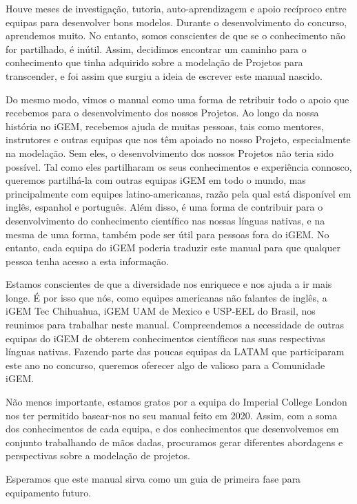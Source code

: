 \documentclass[11pt, letterpaper, portuguese]{article}
\begin{document}
\par{Houve meses de investigação, tutoria, auto-aprendizagem e apoio recíproco entre equipas para desenvolver bons modelos. Durante o desenvolvimento do concurso, aprendemos muito. No entanto, somos conscientes de que se o conhecimento não for partilhado, é inútil. Assim, decidimos encontrar um caminho para o conhecimento que tinha adquirido sobre a modelação de Projetos para transcender, e foi assim que surgiu a ideia de escrever este manual nascido.
} 

\par{Do mesmo modo, vimos o manual como uma forma de retribuir todo o apoio que recebemos para o desenvolvimento dos nossos Projetos. Ao longo da nossa história no iGEM, recebemos ajuda de muitas pessoas, tais como mentores, instrutores e outras equipas que nos têm apoiado no nosso Projeto, especialmente na modelação. Sem eles, o desenvolvimento dos nossos Projetos não teria sido possível. Tal como eles partilharam os seus conhecimentos e experiência connosco, queremos partilhá-la com outras equipas iGEM em todo o mundo, mas principalmente com equipes latino-americanas, razão pela qual está disponível em inglês, espanhol e português. Além disso, é uma forma de contribuir para o desenvolvimento do conhecimento científico nas nossas línguas nativas, e na mesma de uma forma, também pode ser útil para pessoas fora do iGEM. No entanto, cada equipa do iGEM poderia traduzir este manual para que qualquer pessoa tenha acesso a esta informação.} 

\par{Estamos conscientes de que a diversidade nos enriquece e nos ajuda a ir mais longe. É por isso que nós, como equipes americanas não falantes de inglês, a iGEM Tec Chihuahua, iGEM UAM de Mexico e USP-EEL do Brasil, nos reunimos para trabalhar neste manual. Compreendemos a necessidade de outras equipas do iGEM de obterem conhecimentos científicos nas suas respectivas línguas nativas. Fazendo parte das poucas equipas da LATAM que participaram este ano no concurso, queremos oferecer algo de valioso para a Comunidade iGEM.

Não menos importante, estamos gratos por a equipa do Imperial College London nos ter permitido basear-nos no seu manual feito em 2020. Assim, com a soma dos conhecimentos de cada equipa, e dos conhecimentos que desenvolvemos em conjunto trabalhando de mãos dadas, procuramos gerar diferentes abordagens e perspectivas sobre a modelação de projetos.}

\par{ Esperamos que este manual sirva como um guia de primeira fase para equipamento futuro.
}
\end{document}
